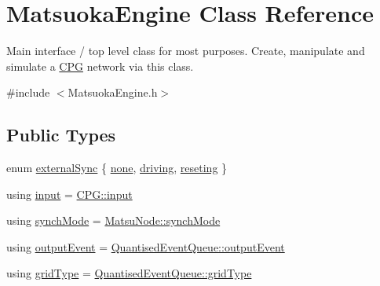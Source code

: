 \hypertarget{classMatsuokaEngine}{}\section{Matsuoka\+Engine Class Reference}
\label{classMatsuokaEngine}


Main interface / top level class for most purposes. Create, manipulate and simulate a \mbox{\hyperlink{classCPG}{C\+PG}} network via this class.  




{\ttfamily \#include $<$Matsuoka\+Engine.\+h$>$}

\subsection*{Public Types}
\begin{DoxyCompactItemize}
\item 
enum \mbox{\hyperlink{classMatsuokaEngine_ad8f471b2f1ca479174d5514b9a3597ec}{external\+Sync}} \{ \mbox{\hyperlink{classMatsuokaEngine_ad8f471b2f1ca479174d5514b9a3597eca4c1d8f9abc3142b344a24624ea7c0a96}{none}}, 
\mbox{\hyperlink{classMatsuokaEngine_ad8f471b2f1ca479174d5514b9a3597ecaf17848b3aa2effcdfd4576b7723ffc7b}{driving}}, 
\mbox{\hyperlink{classMatsuokaEngine_ad8f471b2f1ca479174d5514b9a3597eca66dfc95cb0e1248f30385a100203920c}{reseting}}
 \}
\item 
using \mbox{\hyperlink{classMatsuokaEngine_a811a5449f07004a2eb6b34e8c9bd862f}{input}} = \mbox{\hyperlink{structCPG_1_1input}{C\+P\+G\+::input}}
\item 
using \mbox{\hyperlink{classMatsuokaEngine_acbf2fcb6ddd3b8edc414753248b95fc2}{synch\+Mode}} = \mbox{\hyperlink{classMatsuNode_a725e228db39b8842f851ddf88f640bed}{Matsu\+Node\+::synch\+Mode}}
\item 
using \mbox{\hyperlink{classMatsuokaEngine_a09035e4918ce82c9378821c88375f843}{output\+Event}} = \mbox{\hyperlink{structQuantisedEventQueue_1_1outputEvent}{Quantised\+Event\+Queue\+::output\+Event}}
\item 
using \mbox{\hyperlink{classMatsuokaEngine_aaf41ce5bf63099a1d864e4eb91527cb5}{grid\+Type}} = \mbox{\hyperlink{classQuantisedEventQueue_ae186d50bd503038452edbbdd0c7c259e}{Quantised\+Event\+Queue\+::grid\+Type}}
\end{DoxyCompactItemize}
